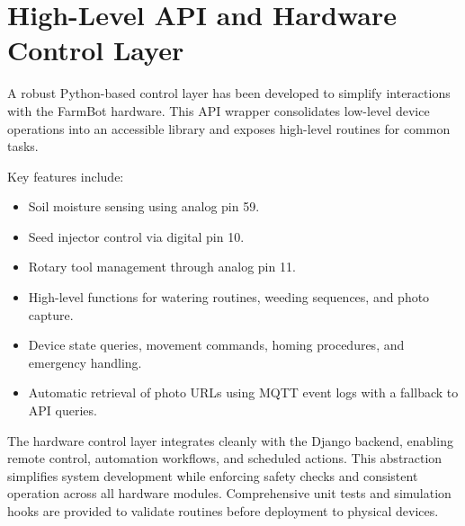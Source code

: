 \section{High-Level API and Hardware Control Layer}

A robust Python-based control layer has been developed to simplify interactions with the FarmBot hardware. This API wrapper consolidates low-level device operations into an accessible library and exposes high-level routines for common tasks.

Key features include:
\begin{itemize}
  \item Soil moisture sensing using analog pin 59.
  \item Seed injector control via digital pin 10.
  \item Rotary tool management through analog pin 11.
  \item High-level functions for watering routines, weeding sequences, and photo capture.
  \item Device state queries, movement commands, homing procedures, and emergency handling.
  \item Automatic retrieval of photo URLs using MQTT event logs with a fallback to API queries.
\end{itemize}

The hardware control layer integrates cleanly with the Django backend, enabling remote control, automation workflows, and scheduled actions. This abstraction simplifies system development while enforcing safety checks and consistent operation across all hardware modules. Comprehensive unit tests and simulation hooks are provided to validate routines before deployment to physical devices.

